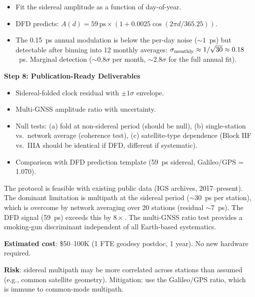 \documentclass[11pt,a4paper]{article}
\newcounter{findingctr}
\newenvironment{finding}[1][]{%
  \refstepcounter{findingctr}%
  \begin{tcolorbox}[colback=blue!3!white, colframe=blue!50!black,
    title=\textbf{Finding \thefindingctr: #1}]
}{%
  \end{tcolorbox}%
}
\begin{document}
\begin{tcolorbox}[colback=green!3!white, colframe=green!60!black,
  title=\textbf{GPS 59~ps Extraction Protocol --- Actionable for Geodesists}]
\begin{itemize}[nosep]
\item Fit the sidereal amplitude as a function of day-of-year.
\item DFD predicts: $A(d) = 59\,\text{ps}\times(1 + 0.0025\cos(2\pi d/365.25))$.
\item The 0.15~ps annual modulation is below the per-day noise
  ($\sim 1$~ps) but detectable after binning into 12 monthly
  averages: $\sigma_{\rm monthly} \approx 1/\sqrt{30} \approx 0.18$~ps.
  Marginal detection ($\sim 0.8\sigma$ per month, $\sim 2.8\sigma$
  for the full annual fit).
\end{itemize}

\textbf{Step 8: Publication-Ready Deliverables}

\begin{itemize}[nosep]
\item Sidereal-folded clock residual with $\pm 1\sigma$ envelope.
\item Multi-GNSS amplitude ratio with uncertainty.
\item Null tests: (a) fold at non-sidereal period (should be null),
  (b) single-station vs.\ network average (coherence test),
  (c) satellite-type dependence (Block IIF vs.\ IIIA should be
  identical if DFD, different if systematic).
\item Comparison with DFD prediction template (59~ps sidereal,
  Galileo/GPS = 1.070).
\end{itemize}

\end{tcolorbox}

\begin{finding}[GPS Protocol Feasibility]
\label{find:GPS-feasibility}
The protocol is feasible with existing public data (IGS archives,
2017--present). The dominant limitation is multipath at the sidereal
period ($\sim 30$~ps per station), which is overcome by network
averaging over 20 stations (residual $\sim 7$~ps). The DFD signal
(59~ps) exceeds this by $8\times$. The multi-GNSS ratio test
provides a smoking-gun discriminant independent of all Earth-based
systematics.

\textbf{Estimated cost}: \$50--100K (1 FTE geodesy postdoc,
1 year). No new hardware required.

\textbf{Risk}: sidereal multipath may be more correlated across
stations than assumed (e.g., common satellite geometry). Mitigation:
use the Galileo/GPS ratio, which is immune to common-mode multipath.
\end{finding}
\end{document}
